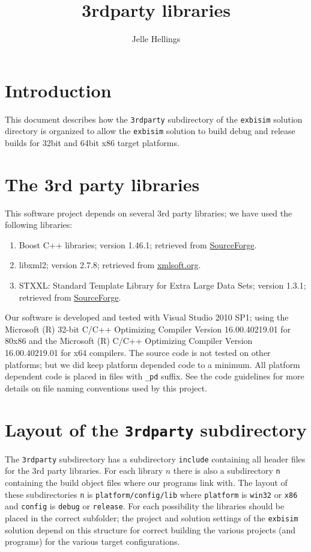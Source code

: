 \documentclass{article}
\title{3rdparty libraries}
\author{Jelle Hellings}
\begin{document}
\maketitle

\section{Introduction}
This document describes how the {\tt 3rdparty} subdirectory of the {\tt exbisim} solution directory is organized to allow the {\tt exbisim} solution to build debug and release builds for 32bit and 64bit x86 target platforms.

\section{The 3rd party libraries}
This software project depends on several 3rd party libraries; we have used the following libraries:
\begin{enumerate}
    \item Boost C++ libraries; version 1.46.1; retrieved from \href{http://sourceforge.net/projects/boost/files/boost/1.46.1/boost_1_46_1.7z/download}{SourceForge}.
    \item libxml2; version 2.7.8; retrieved from \href{ftp://xmlsoft.org/libxml2/libxml2-2.7.8.tar.gz}{xmlsoft.org}.
    \item STXXL: Standard Template Library for Extra Large Data Sets; version 1.3.1; retrieved from \href{http://sourceforge.net/projects/stxxl/files/stxxl/1.3.1/stxxl-1.3.1.tar.gz/download}{SourceForge}.
\end{enumerate}
Our software is developed and tested with Visual Studio 2010 SP1; using the Microsoft (R) 32-bit C/C++ Optimizing Compiler Version 16.00.40219.01 for 80x86 and the Microsoft (R) C/C++ Optimizing Compiler Version 16.00.40219.01 for x64 compilers. The source code is not tested on other platforms; but we did keep platform depended code to a minimum. All platform dependent code is placed in files with {\tt \_pd} suffix. See the code guidelines for more details on file naming conventions used by this project.

\section{Layout of the {\tt 3rdparty} subdirectory}
The {\tt 3rdparty} subdirectory has a subdirectory {\tt include} containing all header files for the $3$rd party libraries. For each library $n$ there is also a subdirectory {\tt n} containing the build object files where our programs link with. The layout of these subdirectories {\tt n} is {\tt platform/config/lib} where {\tt platform} is {\tt win32} or {\tt x86} and {\tt config} is {\tt debug} or {\tt release}. For each possibility the libraries should be placed in the correct subfolder; the project and solution settings of the {\tt exbisim} solution depend on this structure for correct building the various projects (and programs) for the various target configurations.
\end{document}
